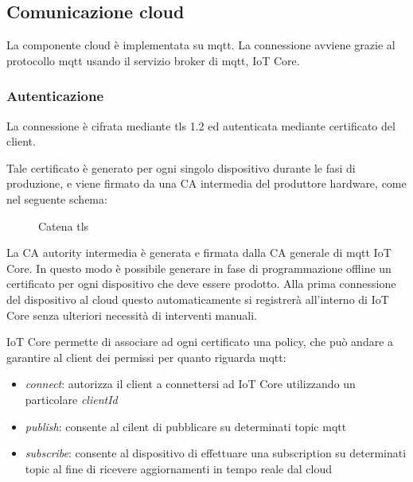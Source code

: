 \documentclass[12pt,a4paper,twoside,titlepage]{book}
\begin{document}
\subsection{Comunicazione cloud}

La componente cloud è implementata su \Gls{mqtt}. La connessione avviene grazie al protocollo
\Gls{mqtt} usando il servizio broker di \Gls{mqtt}, IoT Core.

\subsubsection{Autenticazione}
La connessione è cifrata mediante \gls{tls} 1.2 ed autenticata mediante certificato del client.

Tale certificato è generato per ogni singolo dispositivo durante le fasi di produzione,
e viene firmato da una CA intermedia del produttore hardware, come nel seguente schema:

\begin{figure}[ht]
    \centering
    \caption{Catena \gls{tls}}
    \label{fig:tls-chain}
\end{figure}

La CA autority intermedia è generata e firmata dalla CA generale di \Gls{mqtt} IoT Core. In questo
modo è possibile generare in fase di programmazione offline un certificato per ogni
dispositivo che deve essere prodotto. Alla prima connessione del dispositivo al cloud questo
automaticamente si registrerà all'interno di IoT Core senza ulteriori necessità di interventi manuali.

IoT Core permette di associare ad ogni certificato una policy, che può andare a garantire al
client dei permissi per quanto riguarda \Gls{mqtt}:
\begin{itemize}
    \item \textit{connect}: autorizza il client a connettersi ad IoT Core utilizzando un particolare
        \textit{clientId}
    \item \textit{publish}: consente al cilent di pubblicare su determinati \gls{topic} \Gls{mqtt}
    \item \textit{subscribe}: consente al dispositivo di effettuare una subscription su determinati \gls{topic}
        al fine di ricevere aggiornamenti in tempo reale dal cloud
\end{itemize}
\end{document}

